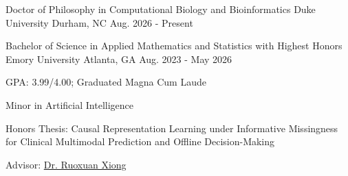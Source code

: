 
\begin{cventries}

  \cventry
    {Doctor of Philosophy in Computational Biology and Bioinformatics} %
    {Duke University} %
    {Durham, NC} %
    {Aug. 2026 - Present} %
    {} %

  \cventry
    {Bachelor of Science in Applied Mathematics and Statistics with Highest Honors} %
    {Emory University} %
    {Atlanta, GA} %
    {Aug. 2023 - May 2026} %
    {
      \begin{cvitems} %
        \item {GPA: 3.99/4.00; Graduated Magna Cum Laude}
        \item {Minor in Artificial Intelligence}
        \item {Honors Thesis: Causal Representation Learning under Informative Missingness for Clinical Multimodal Prediction and Offline Decision-Making}
        \item {Advisor: \href{https://www.ruoxuanxiong.com/}{Dr. Ruoxuan Xiong}}
      \end{cvitems}
    }

\end{cventries}
